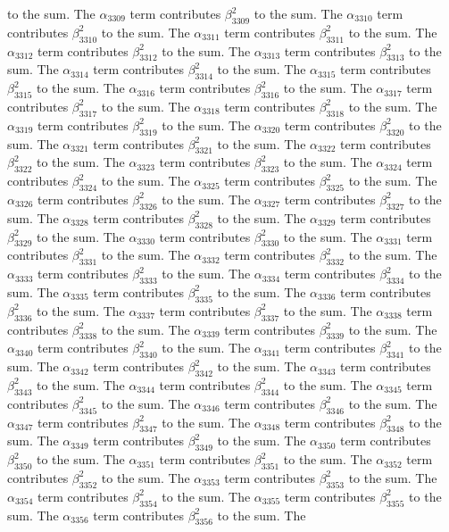 \begin{lemma}
to the sum. The $\alpha_{3309}$ term contributes $\beta_{3309}^{2}$ to the sum. The $\alpha_{3310}$ term contributes $\beta_{3310}^{2}$ to the sum. The $\alpha_{3311}$ term contributes $\beta_{3311}^{2}$ to the sum. The $\alpha_{3312}$ term contributes $\beta_{3312}^{2}$ to the sum. The $\alpha_{3313}$ term contributes $\beta_{3313}^{2}$ to the sum. The $\alpha_{3314}$ term contributes $\beta_{3314}^{2}$ to the sum. The $\alpha_{3315}$ term contributes $\beta_{3315}^{2}$ to the sum. The $\alpha_{3316}$ term contributes $\beta_{3316}^{2}$ to the sum. The $\alpha_{3317}$ term contributes $\beta_{3317}^{2}$ to the sum. The $\alpha_{3318}$ term contributes $\beta_{3318}^{2}$ to the sum. The $\alpha_{3319}$ term contributes $\beta_{3319}^{2}$ to the sum. The $\alpha_{3320}$ term contributes $\beta_{3320}^{2}$ to the sum. The $\alpha_{3321}$ term contributes $\beta_{3321}^{2}$ to the sum. The $\alpha_{3322}$ term contributes $\beta_{3322}^{2}$ to the sum. The $\alpha_{3323}$ term contributes $\beta_{3323}^{2}$ to the sum. The $\alpha_{3324}$ term contributes $\beta_{3324}^{2}$ to the sum. The $\alpha_{3325}$ term contributes $\beta_{3325}^{2}$ to the sum. The $\alpha_{3326}$ term contributes $\beta_{3326}^{2}$ to the sum. The $\alpha_{3327}$ term contributes $\beta_{3327}^{2}$ to the sum. The $\alpha_{3328}$ term contributes $\beta_{3328}^{2}$ to the sum. The $\alpha_{3329}$ term contributes $\beta_{3329}^{2}$ to the sum. The $\alpha_{3330}$ term contributes $\beta_{3330}^{2}$ to the sum. The $\alpha_{3331}$ term contributes $\beta_{3331}^{2}$ to the sum. The $\alpha_{3332}$ term contributes $\beta_{3332}^{2}$ to the sum. The $\alpha_{3333}$ term contributes $\beta_{3333}^{2}$ to the sum. The $\alpha_{3334}$ term contributes $\beta_{3334}^{2}$ to the sum. The $\alpha_{3335}$ term contributes $\beta_{3335}^{2}$ to the sum. The $\alpha_{3336}$ term contributes $\beta_{3336}^{2}$ to the sum. The $\alpha_{3337}$ term contributes $\beta_{3337}^{2}$ to the sum. The $\alpha_{3338}$ term contributes $\beta_{3338}^{2}$ to the sum. The $\alpha_{3339}$ term contributes $\beta_{3339}^{2}$ to the sum. The $\alpha_{3340}$ term contributes $\beta_{3340}^{2}$ to the sum. The $\alpha_{3341}$ term contributes $\beta_{3341}^{2}$ to the sum. The $\alpha_{3342}$ term contributes $\beta_{3342}^{2}$ to the sum. The $\alpha_{3343}$ term contributes $\beta_{3343}^{2}$ to the sum. The $\alpha_{3344}$ term contributes $\beta_{3344}^{2}$ to the sum. The $\alpha_{3345}$ term contributes $\beta_{3345}^{2}$ to the sum. The $\alpha_{3346}$ term contributes $\beta_{3346}^{2}$ to the sum. The $\alpha_{3347}$ term contributes $\beta_{3347}^{2}$ to the sum. The $\alpha_{3348}$ term contributes $\beta_{3348}^{2}$ to the sum. The $\alpha_{3349}$ term contributes $\beta_{3349}^{2}$ to the sum. The $\alpha_{3350}$ term contributes $\beta_{3350}^{2}$ to the sum. The $\alpha_{3351}$ term contributes $\beta_{3351}^{2}$ to the sum. The $\alpha_{3352}$ term contributes $\beta_{3352}^{2}$ to the sum. The $\alpha_{3353}$ term contributes $\beta_{3353}^{2}$ to the sum. The $\alpha_{3354}$ term contributes $\beta_{3354}^{2}$ to the sum. The $\alpha_{3355}$ term contributes $\beta_{3355}^{2}$ to the sum. The $\alpha_{3356}$ term contributes $\beta_{3356}^{2}$ to the sum. The 
\end{lemma}
